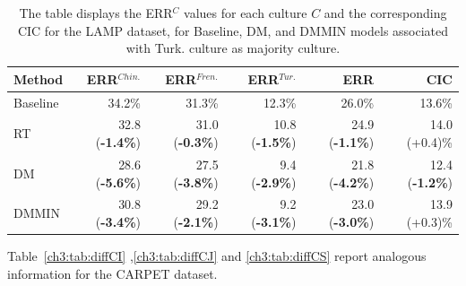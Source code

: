 %
%
\begin{table} [H]
\centering
\begin{tabular}{lrrrrr}
\toprule
\textbf{Method} & \textbf{ERR$^{Chin.}$} & \textbf{ERR$^{Fren.}$} & \textbf{ERR$^{Tur.}$} & \textbf{ERR} & \textbf{CIC} \\
\midrule
Baseline     & 34.2\% & 31.3\% & 12.3\% & 26.0\% & 13.6\% \\
RT           & 32.8 (\textbf{-1.4\%}) & 31.0 (\textbf{-0.3\%}) & 10.8 (\textbf{-1.5\%}) & 24.9 (\textbf{-1.1\%}) & 14.0 (+0.4)\% \\
DM           & 28.6 (\textbf{-5.6\%}) & 27.5 (\textbf{-3.8\%}) & 9.4 (\textbf{-2.9\%}) & 21.8 (\textbf{-4.2\%}) & 12.4 (\textbf{-1.2\%}) \\
DMMIN        & 30.8 (\textbf{-3.4\%}) & 29.2 (\textbf{-2.1\%}) & 9.2 (\textbf{-3.1\%}) & 23.0 (\textbf{-3.0\%}) & 13.9 (+0.3)\% \\
\bottomrule
\end{tabular}
\caption{The table displays the ERR$^C$ values for each culture $C$ and the corresponding CIC for the LAMP dataset, for Baseline, DM, and DMMIN models associated with Turk. culture as majority culture.}
\label{ch3:tab:diffLT}
\end{table}
%
Table~\ref{ch3:tab:diffCI} ,\ref{ch3:tab:diffCJ} and \ref{ch3:tab:diffCS} report analogous information for the CARPET dataset.

